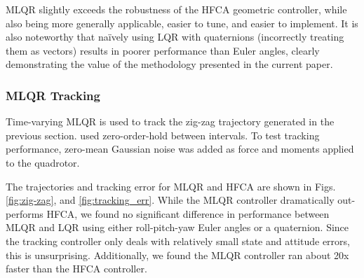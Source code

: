 \documentclass[letterpaper, 10 pt, conference]{ieeeconf}  %
\begin{document}
	    MLQR slightly exceeds the robustness of the HFCA geometric controller, while also
	    being more generally applicable, easier to tune, and easier to implement. It is
	    also noteworthy that na\"ively using LQR with quaternions (incorrectly treating
	    them as vectors) results in poorer performance than Euler angles, clearly
	    demonstrating the value of the methodology presented in the current paper.
	    
	    \subsubsection{MLQR Tracking}
	    Time-varying MLQR is used to track the zig-zag trajectory generated in the
	    previous section. %
	    used zero-order-hold between intervals. To test tracking performance, zero-mean
	    Gaussian noise was added as force and moments applied to the quadrotor.
	    
	    The trajectories and tracking error for MLQR and HFCA are shown in Figs.
	    \ref{fig:zig-zag}, and \ref{fig:tracking_err}. While the MLQR controller
	    dramatically out-performs HFCA, we found no significant difference in performance
	    between MLQR and LQR using either roll-pitch-yaw Euler angles or a quaternion.
	    Since the tracking controller only deals with relatively small state and attitude
	    errors, this is unsurprising. Additionally, we found the MLQR controller ran
        about 20x faster than the HFCA controller.
\end{document}
